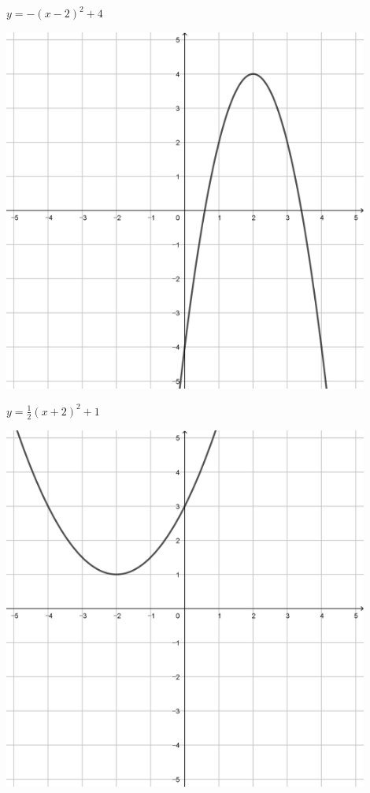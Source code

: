 \documentclass[a4paper]{oblivoir}
\begin{document}
\begin{minipage}{0.45\textwidth}\centering
\(y=-(x-2)^2+4\)
\par\bigskip\includegraphics[width=0.9\textwidth]{img/9-3}
\end{minipage}
\begin{minipage}{0.45\textwidth}\centering
\(y=\frac12(x+2)^2+1\)
\par\bigskip\includegraphics[width=0.9\textwidth]{img/9-4}
\end{minipage}\bigskip\bigskip\par
\end{document}
